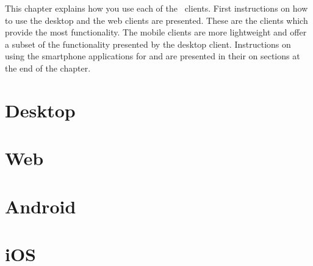

This chapter explains how you use each of the \appName\ clients. First instructions on how to use the desktop and the web clients are presented. These are the clients which provide the most functionality. The mobile clients are more lightweight and offer a subset of the functionality presented by the desktop client. Instructions on using the smartphone applications for  and  are presented in their on sections at the end of the chapter. 


\section{Desktop}

\FloatBarrier

\section{Web}

\FloatBarrier

\section{Android}


\FloatBarrier

\section{iOS}


\FloatBarrier
